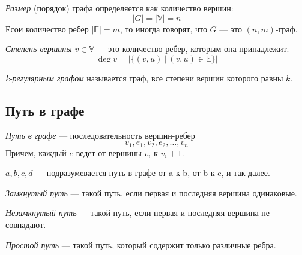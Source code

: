 \documentclass[russian]{lecture-notes}
\begin{document}
	\begin{definition}
		\textit{Размер} (порядок) графа определяется как количество вершин:
		$$|G| = |\mathbb{V}| = n$$
		Есои количество ребер $|\mathbb{E}| = m$, то иногда говорят, что $G$ --- это $(n,m)$-граф.
	\end{definition}
	
	\begin{definition}
		\textit{Степень вершины} $v \in \mathbb{V}$ --- это количество ребер, которым она принадлежит.
		$$\deg v = |\{(v,u)~|~(v,u) \in \mathbb{E}\}|$$
	\end{definition}
	
	\begin{definition}
		\textit{k-регулярным графом} называется граф, все степени вершин которого равны $k$.
	\end{definition}

	\subsection{Путь в графе}
	\begin{definition}
		\textit{Путь в графе} --- последовательность вершин-ребер
		$$v_1, e_1, v_2, e_2, \dots, v_n$$
		Причем, каждый $e$ ведет от вершины $v_i$ к $v_i+1$.
	\end{definition}
	
	\begin{example}
		$a,b,c,d$ --- подразумевается путь в графе от a к b, от b к c, и так далее.
	\end{example}
	
	\begin{definition}
		\textit{Замкнутый путь} --- такой путь, если первая и последняя вершина одинаковые.
	\end{definition}
	\begin{definition}
		\textit{Незамкнутый путь} --- такой путь, если первая и последняя вершина не совпадают.
	\end{definition}
	\begin{definition}
		\textit{Простой путь} --- такой путь, который содержит только различные ребра.
	\end{definition}
	
\end{document}
